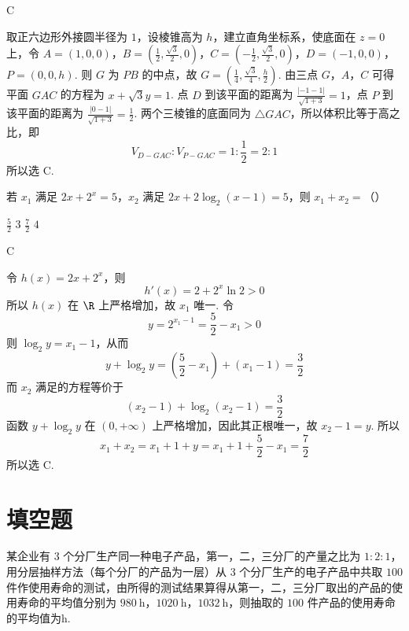 \begin{answer}
C
\end{answer}

\begin{solution}
取正六边形外接圆半径为 \(1\)，设棱锥高为 \(h\)，建立直角坐标系，使底面在 \(z=0\) 上，令 \(A=(1,0,0)\)，\(B=\left(\frac12,\frac{\sqrt3}{2},0\right)\)，\(C=\left(-\frac12,\frac{\sqrt3}{2},0\right)\)，\(D=(-1,0,0)\)，\(P=(0,0,h)\). 则 \(G\) 为 \(PB\) 的中点，故 \(G=\left(\frac14,\frac{\sqrt3}{4},\frac h2\right)\). 由三点 \(G\)，\(A\)，\(C\) 可得平面 \(GAC\) 的方程为 \(x+\sqrt3y=1\). 点 \(D\) 到该平面的距离为 \(\frac{|-1-1|}{\sqrt{1+3}}=1\)，点 \(P\) 到该平面的距离为 \(\frac{|0-1|}{\sqrt{1+3}}=\frac12\).
两个三棱锥的底面同为 \(\triangle GAC\)，所以体积比等于高之比，即
\[
V_{D-GAC}:V_{P-GAC}=1:\frac12=2:1
\]
所以选 C.
\end{solution}

\begin{problem}
若 \(x_{1}\) 满足 \(2x + 2^{x} = 5\)，\(x_{2}\) 满足 \(2x + 2\log_{2}(x - 1) = 5\)，则 \(x_{1} + x_{2} =\)（\quad）

\choices
    {\( \frac{5}{2} \)}
    {\(3\)}
    {\( \frac{7}{2} \)}
    {\(4\)}
\end{problem}

\begin{answer}
C
\end{answer}

\begin{solution}
令 \(h(x)=2x+2^x\)，则
\[
h'(x)=2+2^x\ln2>0
\]
所以 \(h(x)\) 在 \(\R\) 上严格增加，故 \(x_1\) 唯一. 令
\[
y=2^{x_1-1}=\frac52-x_1>0
\]
则 \(\log_2y=x_1-1\)，从而
\[
y+\log_2y=\left(\frac52-x_1\right)+(x_1-1)=\frac32
\]
而 \(x_2\) 满足的方程等价于
\[
(x_2-1)+\log_2(x_2-1)=\frac32
\]
函数 \(y+\log_2y\) 在 \((0,+\infty)\) 上严格增加，因此其正根唯一，故 \(x_2-1=y\). 所以
\[
x_1+x_2=x_1+1+y=x_1+1+\frac52-x_1=\frac72
\]
所以选 C.
\end{solution}

\section{填空题}

\begin{problem}
某企业有 \(3\) 个分厂生产同一种电子产品，第一，二，三分厂的产量之比为 \(1:2:1\)，用分层抽样方法（每个分厂的产品为一层）从 \(3\) 个分厂生产的电子产品中共取 \(100\) 件作使用寿命的测试，由所得的测试结果算得从第一，二，三分厂取出的产品的使用寿命的平均值分别为 \(980 \mathrm{~h}\)，\(1020 \mathrm{~h}\)，\(1032 \mathrm{~h}\)，则抽取的 \(100\) 件产品的使用寿命的平均值为\fillinblank{}\(\mathrm{h}\).
\end{problem}

